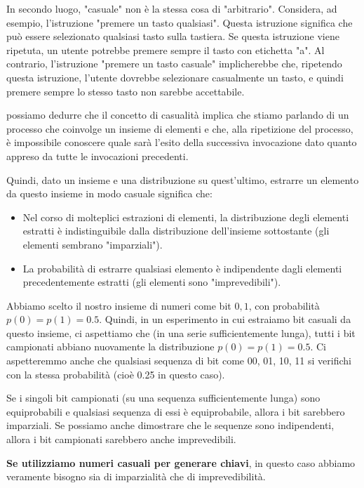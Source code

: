 \documentclass[11pt]{article}
\theoremstyle{definition} \newtheorem{definizione}{Definizione}[section] %
\begin{document}
    In secondo luogo, "casuale" non è la stessa cosa di "arbitrario". Considera, ad esempio, l'istruzione "premere un tasto qualsiasi". Questa istruzione significa che può essere selezionato qualsiasi tasto sulla tastiera. Se questa istruzione viene ripetuta, un utente potrebbe premere sempre il tasto con etichetta "a". Al contrario, l'istruzione "premere un tasto casuale" implicherebbe che, ripetendo questa istruzione, l'utente dovrebbe selezionare casualmente un tasto, e quindi premere sempre lo stesso tasto non sarebbe accettabile.

    possiamo dedurre che il concetto di casualità implica che stiamo parlando di un processo che coinvolge un insieme di elementi e che, alla ripetizione del processo, è impossibile conoscere quale sarà l'esito della successiva invocazione dato quanto appreso da tutte le invocazioni precedenti.

    Quindi, dato un insieme e una distribuzione su quest'ultimo, estrarre un elemento da questo insieme in modo casuale significa che:
    \begin{itemize}
    \item Nel corso di molteplici estrazioni di elementi, la distribuzione degli elementi estratti è indistinguibile dalla distribuzione dell'insieme sottostante (gli elementi sembrano "imparziali").
    \item La probabilità di estrarre qualsiasi elemento è indipendente dagli elementi precedentemente estratti (gli elementi sono "imprevedibili").
    \end{itemize}

    Abbiamo scelto il nostro insieme di numeri come bit ${0, 1}$, con probabilità $p(0) = p(1) = 0.5$. Quindi, in un esperimento in cui estraiamo bit casuali da questo insieme, ci aspettiamo che (in una serie sufficientemente lunga), tutti i bit campionati abbiano nuovamente la distribuzione $p(0) = p(1) = 0.5$. Ci aspetteremmo anche che qualsiasi sequenza di bit come 00, 01, 10, 11 si verifichi con la stessa probabilità (cioè 0.25 in questo caso).

    Se i singoli bit campionati (su una sequenza sufficientemente lunga) sono equiprobabili e qualsiasi sequenza di essi è equiprobabile, allora i bit sarebbero imparziali. Se possiamo anche dimostrare che le sequenze sono indipendenti, allora i bit campionati sarebbero anche imprevedibili.

    \textbf{Se utilizziamo numeri casuali per generare chiavi}, in questo caso abbiamo veramente bisogno sia di imparzialità che di imprevedibilità.
\end{document}
